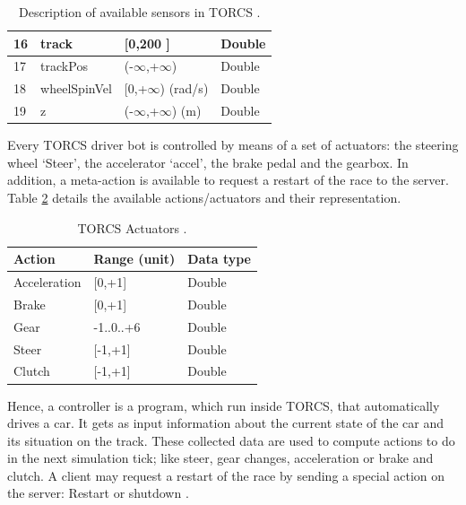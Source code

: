 \documentclass[runningheads,a4paper]{llncs}
\begin{document}
\begin{table}[ht!]
{{\begin{tabular}{|p{2cm}|p{3cm}|p{3 cm}|p{3 cm}|}
					\hline
					16 & track &  [0,200 ] & Double\\ 
					\hline
					17 & trackPos & (-$\infty$,+$\infty$) & Double\\
					
					\hline
					
					18 & wheelSpinVel  & [0,+$\infty$) (rad/s) & Double\\
					
					\hline
					19 & z &  (-$\infty$,+$\infty$) (m) & Double\\
					
					\hline
					
				\end{tabular}
			}
		}
		\caption{Description of available sensors in TORCS \cite{Torcs3}.}
		\label{t1}
	\end{table}
	
	Every TORCS driver bot is controlled by means of a set of actuators: the steering wheel `Steer', the accelerator `accel', the brake pedal and the gearbox. In addition, a meta-action is available to request a restart of the race to the server. Table \ref{tab2} details the available actions/actuators and their representation.
	
	\begin{table}[ht!]
		{\scriptsize
			{\centering
				\begin{tabular}{|p{3cm}|p{3 cm}|p{3 cm}|}
					\hline
					
					{\textbf{Action} }&
					{\textbf{Range} (unit)} &  
					{\textbf{Data type}}\\ 
					\hline
					Acceleration & [0,+1] & Double\\ 
					\hline
					Brake & [0,+1]	& Double\\
					\hline
					Gear & -1..0..+6	& Double\\
					\hline
					Steer & [-1,+1]	& Double\\
					\hline
					Clutch & [-1,+1]	& Double\\
					\hline
				\end{tabular}
			}
		}
		\caption{TORCS Actuators \cite{torcs2012}.}
		\label{tab2}
	\end{table}
	
	Hence, a controller is a program, which run inside TORCS, that automatically drives a car. It gets as input information about the current state of the car and its situation on the track. These collected data are used to compute actions to do in the next simulation tick; like steer, gear changes, acceleration or brake and clutch. A client may request a restart of the race by sending a special action on the server: Restart or shutdown \cite{manualTORCS}.
	
\end{document}
